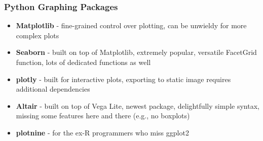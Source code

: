 \documentclass[12pt]{article}
\begin{document}
\subsubsection{Python Graphing Packages}
\begin{itemize}
    \item \textbf{Matplotlib} - fine-grained control over plotting, can be unwieldy for more complex plots
    \item \textbf{Seaborn} - built on top of Matplotlib, extremely popular, versatile FacetGrid function, lots of dedicated functions as well
    \item \textbf{plotly} - built for interactive plots, exporting to static image requires additional dependencies
    \item \textbf{Altair} - built on top of Vega Lite, newest package, delightfully simple syntax, missing some features here and there (e.g., no boxplots)
    \item \textbf{plotnine} - for the ex-R programmers who miss ggplot2
\end{itemize}
\end{document}

